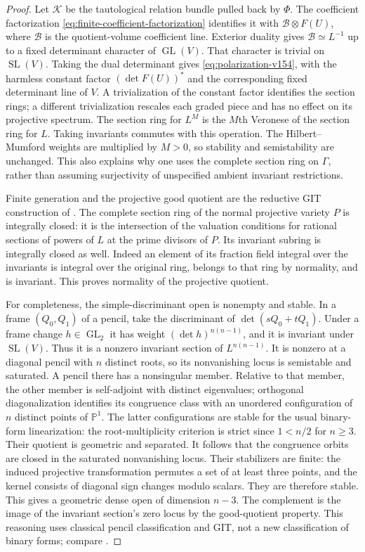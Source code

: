 \documentclass[11pt,reqno]{amsart}
\numberwithin{equation}{section}
\theoremstyle{definition}\newtheorem{definition}[theorem]{Definition}
\theoremstyle{remark}\newtheorem{remark}[theorem]{Remark}
\newcommand{\Pj}{\mathbb P}\newcommand{\A}{\mathbb A}
\begin{document}
\begin{proof}
Let $\mathcal K$ be the tautological relation bundle pulled back by
$\Phi$. The coefficient factorization
\eqref{eq:finite-coefficient-factorization} identifies it with
$\mathcal B\otimes F(U)$, where $\mathcal B$ is the quotient-volume
coefficient line. Exterior duality gives
$\mathcal B\simeq L^{-1}$ up to a fixed determinant character of
$\operatorname{GL}(V)$. That character is trivial on
$\operatorname{SL}(V)$. Taking the dual determinant gives
\eqref{eq:polarization-v154}, with the harmless constant factor
$(\det F(U))^*$ and the corresponding fixed determinant line of $V$.
A trivialization of the constant factor identifies the section rings;
a different trivialization rescales each graded piece and has no
effect on its projective spectrum. The section ring for $L^M$ is
the $M$th Veronese of the section ring for $L$. Taking invariants
commutes with this operation. The Hilbert--Mumford weights are
multiplied by $M>0$, so stability and semistability are unchanged.
This also explains why one uses the complete section ring on
$\Gamma$, rather than assuming surjectivity of unspecified ambient
invariant restrictions.

Finite generation and the projective good quotient are the reductive
GIT construction of \cite[Chapter~1]{MFK1994}. The complete section
ring of the normal projective variety $P$ is integrally closed: it
is the intersection of the valuation conditions for rational sections
of powers of $L$ at the prime divisors of $P$. Its invariant subring
is integrally closed as well. Indeed an element of its fraction
field integral over the invariants is integral over the original
ring, belongs to that ring by normality, and is invariant. This proves
normality of the projective quotient.

For completeness, the simple-discriminant open is nonempty and
stable. In a frame $(Q_0,Q_1)$ of a pencil, take the discriminant of
$\det(sQ_0+tQ_1)$. Under a frame change $h\in\operatorname{GL}_2$
it has weight $(\det h)^{n(n-1)}$, and it is invariant under
$\operatorname{SL}(V)$. Thus it is a nonzero invariant section of
$L^{n(n-1)}$. It is nonzero at a diagonal pencil with $n$ distinct
roots, so its nonvanishing locus is semistable and saturated.
A pencil there has a nonsingular member. Relative to that member,
the other member is self-adjoint with distinct eigenvalues;
orthogonal diagonalization identifies its congruence class with an
unordered configuration of $n$ distinct points of $\Pj^1$.
The latter configurations are stable for the usual binary-form
linearization: the root-multiplicity criterion is strict since
$1<n/2$ for $n\geq3$. Their quotient is geometric and separated.
It follows that the congruence orbits are closed in the saturated
nonvanishing locus. Their stabilizers are finite: the induced
projective transformation permutes a set of at least three points,
and the kernel consists of diagonal sign changes modulo scalars.
They are therefore stable. This gives a geometric dense open of
dimension $n-3$. The complement is the image of the invariant
section's zero locus by the good-quotient property. This reasoning
uses classical pencil classification and GIT, not a new classification
of binary forms; compare \cite{FevolaMandelshtamSturmfels,MFK1994}.


\end{proof}
\end{document}
